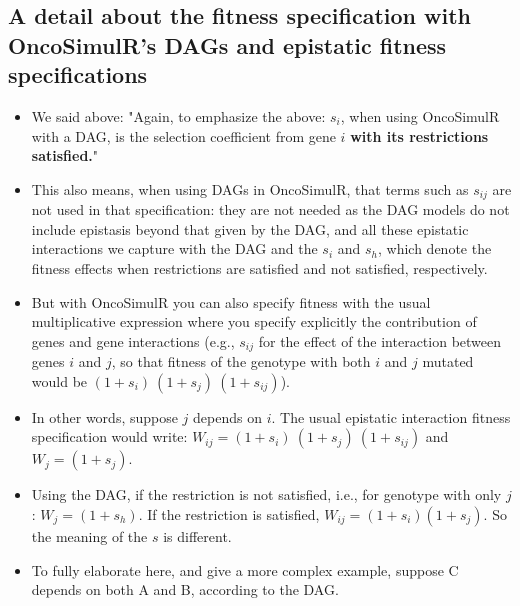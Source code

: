 \documentclass[11pt]{article}
\begin{document}
\subsection{A detail about the fitness specification with OncoSimulR's DAGs and epistatic fitness specifications}
\label{sec:orgcea5033}

\begin{itemize}
\item We said above: "Again, to emphasize the above: \(s_i\), when using OncoSimulR with a DAG, is the selection coefficient from gene \(i\) \textbf{with its restrictions satisfied.}"

\item This also means, when using DAGs in OncoSimulR, that terms such as \(s_{ij}\) are not used in that specification: they are not needed as the DAG models do not include epistasis beyond that given by the DAG, and all these epistatic interactions we capture with the DAG and the \(s_i\) and \(s_h\), which denote the fitness effects when restrictions are satisfied and not satisfied, respectively.

\item But with OncoSimulR you can also specify fitness with the usual multiplicative expression where you specify explicitly the contribution of genes and gene interactions (e.g., \(s_{ij}\) for the effect of the interaction between genes \(i\) and \(j\), so that fitness of the genotype with both \(i\) and \(j\) mutated would be \((1 + s_i)\ (1 + s_j)\ (1 + s_{ij})\)).

\item In other words, suppose \(j\) depends on \(i\). The usual epistatic interaction fitness specification would write: \(W_{ij} = (1 + s_i)\ (1 + s_j)\ (1 + s_{ij})\) and \(W_j = (1 + s_j)\).

\item Using the DAG, if the restriction is not satisfied, i.e., for genotype with only \(j\): \(W_j = (1 + s_h)\). If the restriction is satisfied, \(W_{ij} = (1 + s_i) (1 + s_j)\). So the meaning of the \(s\) is different.

\item To fully elaborate here, and give a more complex example, suppose C depends on both A and B, according to the DAG. 


\end{itemize}
\end{document}

